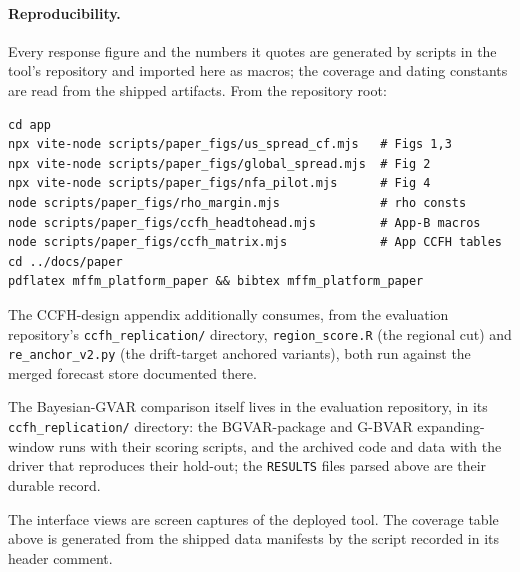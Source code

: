 \documentclass[11pt]{article}
\begin{document}
\paragraph{Reproducibility.} Every response figure and the numbers it quotes are
generated by scripts in the tool's repository and imported here as macros; the coverage and
dating constants are read from the shipped artifacts. From the repository root:
\begin{verbatim}
cd app
npx vite-node scripts/paper_figs/us_spread_cf.mjs   # Figs 1,3
npx vite-node scripts/paper_figs/global_spread.mjs  # Fig 2
npx vite-node scripts/paper_figs/nfa_pilot.mjs      # Fig 4
node scripts/paper_figs/rho_margin.mjs              # rho consts
node scripts/paper_figs/ccfh_headtohead.mjs         # App-B macros
node scripts/paper_figs/ccfh_matrix.mjs             # App CCFH tables
cd ../docs/paper
pdflatex mffm_platform_paper && bibtex mffm_platform_paper
\end{verbatim}
\begin{sloppypar}
The CCFH-design appendix additionally consumes, from the evaluation repository's
\texttt{ccfh\_replication/} directory, \texttt{region\_score.R} (the regional cut) and
\texttt{re\_anchor\_v2.py} (the drift-target anchored variants), both run against the
merged forecast store documented there.
\end{sloppypar}
\begin{sloppypar}
The Bayesian-GVAR comparison itself lives in the evaluation repository, in its
\texttt{ccfh\_replication/} directory: the BGVAR-package and G-BVAR expanding-window runs
with their scoring scripts, and the archived \citeauthor{CrespoFeldkircherHuber2016} code
and data with the driver that reproduces their hold-out; the \texttt{RESULTS} files parsed
above are their durable record.
\end{sloppypar}
The interface views are screen captures of the deployed tool. The coverage table above is
generated from the shipped data manifests by the script recorded in its header comment.



\end{document}
